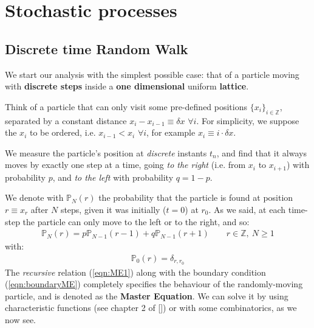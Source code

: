\documentclass[../template.tex]{subfiles}
\begin{document}
\chapter{Stochastic processes}

\section{Discrete time Random Walk}
We start our analysis with the simplest possible case: that of a particle moving with \textbf{discrete steps} inside a \textbf{one dimensional} uniform \textbf{lattice}. 

Think of a particle that can only visit some pre-defined positions $\{x_i\}_{i \in \mathbb{Z}}$, separated by a constant distance $x_{i}-x_{i-1} \equiv \delta x$ $\forall i$. For simplicity, we suppose the $x_i$ to be ordered, i.e. $x_{i-1} < x_i$ $\forall i$, for example $x_i \equiv i \cdot \delta x$.

We measure the particle's position at \textit{discrete} instants $t_n$, and find that it always moves by exactly one step at a time, going \textit{to the right} (i.e. from $x_i$ to $x_{i+1}$) with probability $p$, and \textit{to the left} with probability $q = 1-p$.   


We denote with $\mathbb{P}_N(r)$ the probability that the particle is found at position $r \equiv x_r$ after $N$ steps, given it was initially ($t=0$) at $r_0$. As we said, at each time-step the particle can only move to the left or to the right, and so:
\begin{align}\label{eqn:ME1}
    \mathbb{P}_N(r) = p \mathbb{P}_{N-1}(r-1) + q \mathbb{P}_{N-1}(r+1) \qquad r \in \mathbb{Z},\>  N \geq 1
\end{align}
with:
\begin{align}
    \mathbb{P}_0(r) = \delta_{r,r_0} \label{eqn:boundaryME}
\end{align}
The \textit{recursive} relation (\ref{eqn:ME1}) along with the boundary condition (\ref{eqn:boundaryME}) completely specifies the behaviour of the randomly-moving particle, and is denoted as the \textbf{Master Equation}. We can solve it by using characteristic functions (see chapter 2 of [])%
or with some combinatorics, as we now see.

\medskip
\end{document}
